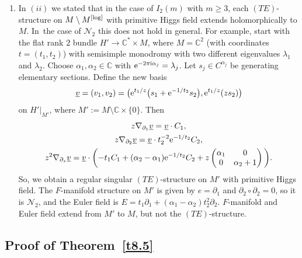 \documentclass[pdftex]{sigma}%
\numberwithin{equation}{section}
\numberwithin{figure}{section}
\newcommand{\C}{{\mathbb C}}
\newcommand{\EE}{{\mathcal E}}
\newcommand{\NN}{{\mathcal N}}
\newcommand{\uuuu}{\underline}
\newcommand{\paa}{\partial}
\newcommand{\nnn}{\nabla}
\begin{document}
\begin{Remarks}
\begin{enumerate}
\cite{Sa19} starts in our notation from $(TE)$-structures
which are already formally isomorphic to sums
$\bigoplus_{i=1}^n\EE^{u_i/z}z^{\alpha_i}$.
Then it is shown that they are also holomorphically
isomorphic to such sums. In~this special case, Corollary 5.7 in~\cite{DH20-2}
give this implication, too.

\item[$(v)$] In $(ii)$ we stated that in the case of $I_2(m)$
with $m\geq 3$,
each $(TE)$-structure on $M\setminus M^{\rm [log]}$ with primitive
Higgs field extends holomorphically to $M$. In~the case of $\NN_2$ this does not hold in general.
For example, start with the flat rank $2$ bundle
$H'\to\C^*\times M$, where $M=\C^2$ (with coordinates
$t=(t_1,t_2)$) with semisimple monodromy with two
different eigenvalues $\lambda_1$ and $\lambda_2$.
Choose $\alpha_1,\alpha_2\in\C$ with
${\rm e}^{-2\pi {\rm i}\alpha_j}=\lambda_j$. Let $s_j\in C^{\alpha_j}$
be generating elementary sections.
Define the new basis
\begin{gather*}%
\uuuu{v}=(v_1,v_2)=\big({\rm e}^{t_1/z}\big(s_1+{\rm e}^{-1/t_2}s_2\big),{\rm e}^{t_1/z}(zs_2)\big)
\end{gather*}
on $H'|_{M'}$, where $M':=M\setminus \C\times\{0\}$. Then
\begin{gather*}%
z\nnn_{\paa_1}\uuuu{v}=\uuuu{v}\cdot C_1,
\\
z\nnn_{\paa_2}\uuuu{v}=\uuuu{v}\cdot t_2^{-2}{\rm e}^{-1/t_2}C_2,
\\
z^2\nnn_{\paa_z}\uuuu{v}=\uuuu{v}\cdot
\bigg({-}t_1C_1+(\alpha_2-\alpha_1){\rm e}^{-1/t_2}C_2 +
z\begin{pmatrix}\alpha_1&0\\0&\alpha_2+1\end{pmatrix}\bigg).
\end{gather*}
So, we obtain a regular singular $(TE)$-structure on
$M'$ with primitive Higgs field.
The $F$-manifold structure on $M'$ is given by
$e=\paa_1$ and $\paa_2\circ\paa_2=0$, so it is $\NN_2$,
and the Euler field is
$E=t_1\paa_1 + (\alpha_1-\alpha_2)t_2^2\paa_2$.
$F$-manifold and Euler field extend from
$M'$ to $M$, but not the $(TE)$-structure.
\end{enumerate}
\end{Remarks}


\subsection{Proof of Theorem~\ref{t8.5}}\label{c8.3}
\end{document}
